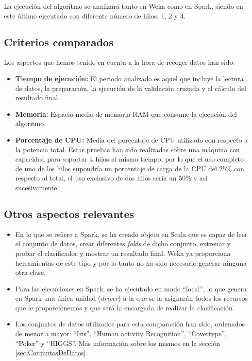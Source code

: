 La ejecución del algoritmo se analizará tanto en Weka como en Spark, siendo en este último ejecutado con diferente número de hilos: 1, 2 y 4.

\subsection{Criterios comparados}

Los aspectos que hemos tenido en cuenta a la hora de recoger datos han sido:

\begin{itemize}
	\item \textbf{Tiempo de ejecución:} El periodo analizado es aquel que incluye la lectura de datos, la preparación, la ejecución de la validación cruzada y el cálculo del resultado final.
	\item \textbf{Memoria:} Espacio medio de memoria RAM que consume la ejecución del algoritmo.
	\item \textbf{Porcentaje de CPU:} Media del porcentaje de CPU utilizado con respecto a la potencia total. Estas pruebas han sido realizadas sobre una máquina con capacidad para soportar 4 hilos al mismo tiempo, por lo que el uso completo de uno de los hilos supondría un porcentaje de carga de la CPU del 25\% con respecto al total, el uso exclusivo de dos hilos sería un 50\% y así sucesivamente.

\end{itemize}

\subsection{Otros aspectos relevantes}

\begin{itemize}
	\item En lo que se refiere a Spark, se ha creado objeto en Scala que es capaz de leer el conjunto de datos, crear diferentes \textit{folds} de dicho conjunto, entrenar y probar el clasificador y mostrar un resultado final. Weka ya proporciona herramientas de este tipo y por lo tanto no ha sido necesario generar ninguna otra clase.
	\item Para las ejecuciones en Spark, se ha ejecutado en modo ``local'', lo que genera en Spark una única unidad (\textit{driver}) a la que se la asignarán todos los recursos que le proporcionemos y que será la encargada de realizar la clasificación.
	\item Los conjuntos de datos utilizados para esta comparación han sido, ordenados de menor a mayor: ``Iris'',  ``Human activity Recognition'', ``Covertype'', ``Poker'' y ``HIGGS''. Más información sobre los mismos en la sección \ref{sec:ConjuntosDeDatos}.
\end{itemize}

